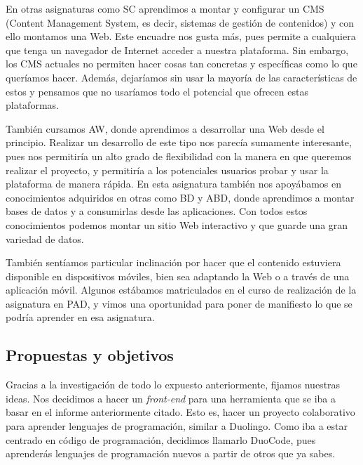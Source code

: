 En otras asignaturas como SC\cite{SC} aprendimos a montar y configurar un CMS (Content Management System, es decir, sistemas de gestión de contenidos) y con ello montamos una Web. Este encuadre nos gusta más, pues permite a cualquiera que tenga un navegador de Internet acceder a nuestra plataforma. Sin embargo, los CMS actuales no permiten hacer cosas tan concretas y específicas como lo que queríamos hacer. Además, dejaríamos sin usar la mayoría de las características de estos y pensamos que no usaríamos todo el potencial que ofrecen estas plataformas.
\vspace{1em}

También cursamos AW\cite{AW}, donde aprendimos a desarrollar una Web desde el principio. Realizar un desarrollo de este tipo nos parecía sumamente interesante, pues nos permitiría un alto grado de flexibilidad con la manera en que queremos realizar el proyecto, y permitiría a los potenciales usuarios probar y usar la plataforma de manera rápida. En esta asignatura también nos apoyábamos en conocimientos adquiridos en otras como BD\cite{BD} y ABD\cite{ABD}, donde aprendimos a montar bases de datos y a consumirlas desde las aplicaciones. Con todos estos conocimientos podemos montar un sitio Web interactivo y que guarde una gran variedad de datos. 
\vspace{1em}

También sentíamos particular inclinación por hacer que el contenido estuviera disponible en dispositivos móviles, bien sea adaptando la Web o a través de una aplicación móvil. Algunos estábamos matriculados en el curso de realización de la asignatura en PAD\cite{PAD}, y vimos una oportunidad para poner de manifiesto lo que se podría aprender en esa asignatura.

\subsection{Propuestas y objetivos\label{subsec:introduction}}

Gracias a la investigación de todo lo expuesto anteriormente, fijamos nuestras ideas. Nos decidimos a hacer un \emph{front-end} para una herramienta que se iba a basar en el informe anteriormente citado\cite{pimcdDuoCode14}. Esto es, hacer un proyecto colaborativo para aprender lenguajes de programación, similar a Duolingo\cite{duolingo}. Como iba a estar centrado en código de programación, decidimos llamarlo DuoCode, pues aprenderás lenguajes de programación nuevos a partir de otros que ya sabes. 
\vspace{1em}

